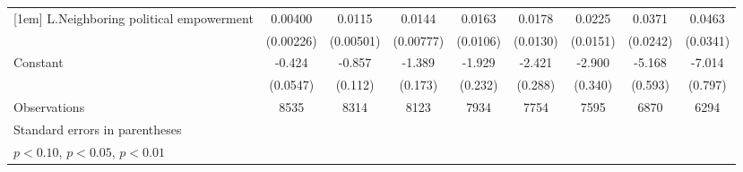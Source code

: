 \begin{table}[htbp]
\begin{tabular}{l*{8}{c}}
[1em]
L.Neighboring political empowerment&     0.00400\sym{*}  &      0.0115\sym{**} &      0.0144\sym{*}  &      0.0163         &      0.0178         &      0.0225         &      0.0371         &      0.0463         \\
                    &   (0.00226)         &   (0.00501)         &   (0.00777)         &    (0.0106)         &    (0.0130)         &    (0.0151)         &    (0.0242)         &    (0.0341)         \\
[1em]
Constant            &      -0.424\sym{***}&      -0.857\sym{***}&      -1.389\sym{***}&      -1.929\sym{***}&      -2.421\sym{***}&      -2.900\sym{***}&      -5.168\sym{***}&      -7.014\sym{***}\\
                    &    (0.0547)         &     (0.112)         &     (0.173)         &     (0.232)         &     (0.288)         &     (0.340)         &     (0.593)         &     (0.797)         \\
\hline
Observations        &        8535         &        8314         &        8123         &        7934         &        7754         &        7595         &        6870         &        6294         \\
\hline\hline
\multicolumn{9}{l}{\footnotesize Standard errors in parentheses}\\
\multicolumn{9}{l}{\footnotesize \sym{*} \(p<0.10\), \sym{**} \(p<0.05\), \sym{***} \(p<0.01\)}\\
\end{tabular}
\end{table}
